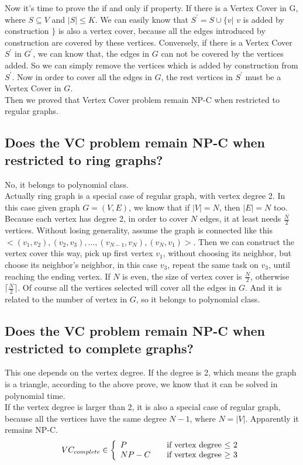 \documentclass[12pt]{report}
\begin{document}
Now it's time to prove the if and only if property. If there is a Vertex Cover in G, where $S \subseteq V$ and $|S| \le K$. We can easily know that $S^{'} = S \cup \{v|$ $v$ is added by construction $\}$ is also a vertex cover, because all the edges introduced by construction are covered by these vertices. Conversely, if there is a Vertex Cover $S^{'}$ in $G^{'}$, we can know that, the edges in $G$ can not be covered by the vertices added. So we can simply remove the vertices which is added by construction from $S^{'}$. Now in order to cover all the edges in $G$, the rest vertices in $S^{'}$ must be a Vertex Cover in $G$. \\
Then we proved that Vertex Cover problem remain NP-C when restricted to regular graphs.
\subsection{Does the VC problem remain NP-C when restricted to ring graphs?}
No, it belongs to polynomial class. \\
Actually ring graph is a special case of regular graph, with vertex degree 2. In this case given graph $G=(V,E)$, we know that if $|V|=N$, then $|E|=N$ too. Because each vertex has degree 2, in order to cover $N$ edges, it at least needs $\frac{N}{2}$ vertices. Without losing generality, assume the graph is connected like this $<(v_{1},v_{2}),(v_{2},v_{3}), ..., (v_{N-1},v_{N}),(v_{N},v_{1})>$. Then we can construct the vertex cover this way, pick up first vertex $v_{1}$, without choosing its neighbor, but choose its neighbor's neighbor, in this case $v_{3}$, repeat the same task on $v_{3}$, until reaching the ending vertex. If $N$ is even, the size of vertex cover is $\frac{N}{2}$, otherwise $\lceil{\frac{N}{2}}\rceil$. Of course all the vertices selected will cover all the edges in $G$. And it is related to the number of vertex in $G$, so it belongs to polynomial class.
\subsection{Does the VC problem remain NP-C when restricted to complete graphs?}
This one depends on the vertex degree. If the degree is 2, which means the graph is a triangle, according to the above prove, we know that it can be solved in polynomial time. \\
If the vertex degree is larger than 2, it is also a special case of regular graph, because all the vertices have the same degree $N-1$, where $N=|V|$. Apparently it remains NP-C. \\
\[VC_{complete} \in \left\{ 
\begin{array}{l l}
  P & \quad \mbox{if vertex degree $\le$ 2}\\
  NP-C & \quad \mbox{if vertex degree $\ge$ 3}\\ \end{array} \right. \]
\end{document}
